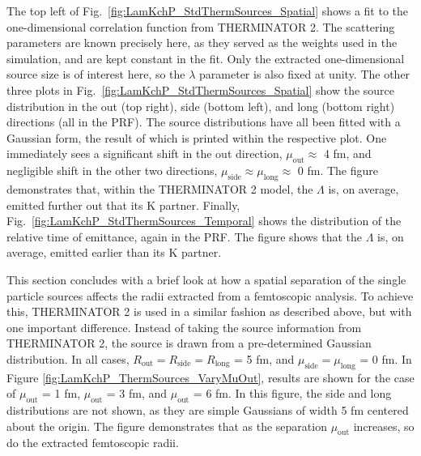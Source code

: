 \documentclass[ALICE,manyauthors]{cernphprep}
\newcommand{\Lam}{$\Lambda$\xspace}
\begin{document}
The top left of Fig.\ \ref{fig:LamKchP_StdThermSources_Spatial} shows a fit to the one-dimensional correlation function from THERMINATOR 2.
The scattering parameters are known precisely here, as they served as the weights used in the simulation, and are kept constant in the fit.
Only the extracted one-dimensional source size is of interest here, so the $\lambda$ parameter is also fixed at unity.
The other three plots in Fig.\ \ref{fig:LamKchP_StdThermSources_Spatial} show the source distribution in the out (top right), side (bottom left), and long (bottom right) directions (all in the PRF).
The source distributions have all been fitted with a Gaussian form, the result of which is printed within the respective plot.
One immediately sees a significant shift in the out direction, $\mu_{\mathrm{out}} \approx$ 4 fm, and negligible shift in the other two directions, $\mu_{\mathrm{side}} \approx \mu_{\mathrm{long}} \approx$ 0 fm.
The figure demonstrates that, within the THERMINATOR 2 model, the \Lam is, on average, emitted further out that its K partner.
Finally, Fig.\ \ref{fig:LamKchP_StdThermSources_Temporal} shows the distribution of the relative time of emittance, again in the PRF.
The figure shows that the \Lam is, on average, emitted earlier than its K partner. 

This section concludes with a brief look at how a spatial separation of the single particle sources affects the radii extracted from a femtoscopic analysis.
To achieve this, THERMINATOR 2 is used in a similar fashion as described above, but with one important difference.
Instead of taking the source information from THERMINATOR 2, the source is drawn from a pre-determined Gaussian distribution.
In all cases, $R_{\mathrm{out}} = R_{\mathrm{side}} = R_{\mathrm{long}}$ = 5 fm, and $\mu_{\mathrm{side}} = \mu_{\mathrm{long}}$ = 0 fm.
In Figure \ref{fig:LamKchP_ThermSources_VaryMuOut}, results are shown for the case of $\mu_{\mathrm{out}}$ = 1 fm, $\mu_{\mathrm{out}}$ = 3 fm, and $\mu_{\mathrm{out}}$ = 6 fm.
In this figure, the side and long distributions are not shown, as they are simple Gaussians of width 5 fm centered about the origin.
The figure demonstrates that as the separation $\mu_{\mathrm{out}}$ increases, so do the extracted femtoscopic radii.
\end{document}
